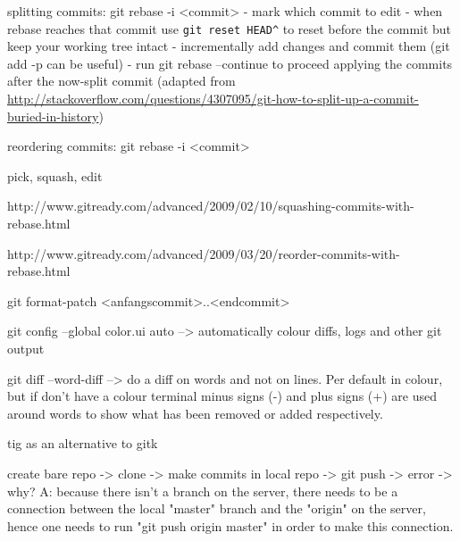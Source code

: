 splitting commits: git rebase -i <commit>
  - mark which commit to edit
  - when rebase reaches that commit use \lstinline{git reset HEAD^} to reset
  before the commit but keep your working tree intact
  - incrementally add changes and commit them (git add -p can be useful)
  - run git rebase --continue to proceed applying the commits after the
  now-split commit
  (adapted from
  \url{http://stackoverflow.com/questions/4307095/git-how-to-split-up-a-commit-buried-in-history})


reordering commits: git rebase -i <commit>

pick, squash, edit

http://www.gitready.com/advanced/2009/02/10/squashing-commits-with-rebase.html

http://www.gitready.com/advanced/2009/03/20/reorder-commits-with-rebase.html

git format-patch <anfangscommit>..<endcommit>


git config --global color.ui auto  --> automatically colour diffs, logs and
other git output

git diff --word-diff  --> do a diff on words and not on lines.  Per default
in colour, but if don't have a colour terminal minus signs (-) and plus
signs (+) are used around words to show what has been removed or added
respectively.

tig as an alternative to gitk

create bare repo -> clone -> make commits in local repo -> git push -> error
-> why?  A: because there isn't a branch on the server, there needs to be a
connection between the local "master" branch and the "origin" on the server,
hence one needs to run "git push origin master" in order to make this
connection.
